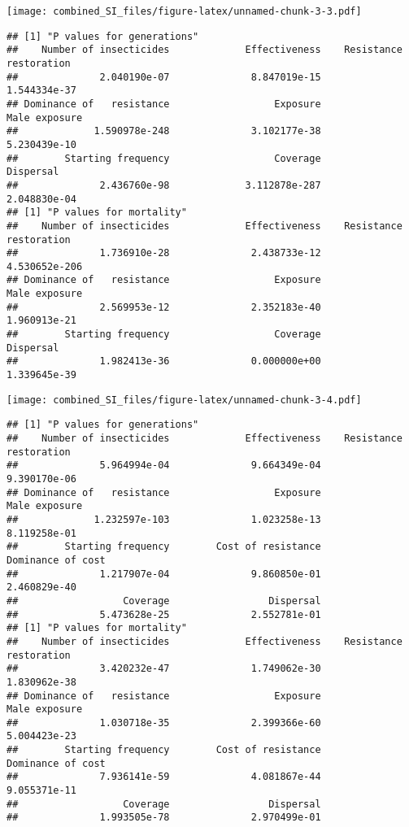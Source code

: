 \documentclass[
]{article}
\begin{document}
\texttt{[image: combined\_SI\_files/figure-latex/unnamed-chunk-3-3.pdf]}

\begin{verbatim}
## [1] "P values for generations"
##    Number of insecticides             Effectiveness    Resistance restoration 
##              2.040190e-07              8.847019e-15              1.544334e-37 
## Dominance of   resistance                  Exposure             Male exposure 
##             1.590978e-248              3.102177e-38              5.230439e-10 
##        Starting frequency                  Coverage                 Dispersal 
##              2.436760e-98             3.112878e-287              2.048830e-04 
## [1] "P values for mortality"
##    Number of insecticides             Effectiveness    Resistance restoration 
##              1.736910e-28              2.438733e-12             4.530652e-206 
## Dominance of   resistance                  Exposure             Male exposure 
##              2.569953e-12              2.352183e-40              1.960913e-21 
##        Starting frequency                  Coverage                 Dispersal 
##              1.982413e-36              0.000000e+00              1.339645e-39
\end{verbatim}

\texttt{[image: combined\_SI\_files/figure-latex/unnamed-chunk-3-4.pdf]}

\begin{verbatim}
## [1] "P values for generations"
##    Number of insecticides             Effectiveness    Resistance restoration 
##              5.964994e-04              9.664349e-04              9.390170e-06 
## Dominance of   resistance                  Exposure             Male exposure 
##             1.232597e-103              1.023258e-13              8.119258e-01 
##        Starting frequency        Cost of resistance         Dominance of cost 
##              1.217907e-04              9.860850e-01              2.460829e-40 
##                  Coverage                 Dispersal 
##              5.473628e-25              2.552781e-01 
## [1] "P values for mortality"
##    Number of insecticides             Effectiveness    Resistance restoration 
##              3.420232e-47              1.749062e-30              1.830962e-38 
## Dominance of   resistance                  Exposure             Male exposure 
##              1.030718e-35              2.399366e-60              5.004423e-23 
##        Starting frequency        Cost of resistance         Dominance of cost 
##              7.936141e-59              4.081867e-44              9.055371e-11 
##                  Coverage                 Dispersal 
##              1.993505e-78              2.970499e-01
\end{verbatim}
\end{document}
